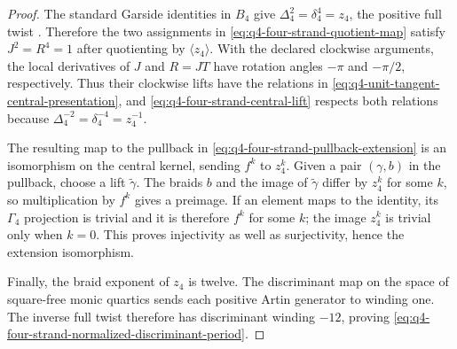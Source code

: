 \begin{proof}
The standard Garside identities in $B_4$ give
$\Delta_4^2=\delta_4^4=z_4$, the positive full twist
\cite[Chapter~1]{Birman1974Braids}.  Therefore the two assignments in
\eqref{eq:q4-four-strand-quotient-map} satisfy $J^2=R^4=1$ after quotienting by
$\langle z_4\rangle$.  With the declared clockwise arguments, the local
derivatives of $J$ and $R=JT$ have rotation angles $-\pi$ and $-\pi/2$,
respectively.  Thus their clockwise lifts have the
relations in \eqref{eq:q4-unit-tangent-central-presentation}, and
\eqref{eq:q4-four-strand-central-lift} respects both relations because
$\Delta_4^{-2}=\delta_4^{-4}=z_4^{-1}$.

The resulting map to the pullback in
\eqref{eq:q4-four-strand-pullback-extension} is an isomorphism on the central
kernel, sending $f^k$ to $z_4^k$.  Given a pair $(\gamma,b)$ in the pullback,
choose a lift $\widetilde\gamma$.  The braids $b$ and the image of
$\widetilde\gamma$ differ by $z_4^k$ for some $k$, so multiplication by $f^k$
gives a preimage.  If an element maps to the identity, its $\Gamma_4$ projection
is trivial and it is therefore $f^k$ for some $k$; the image $z_4^k$ is trivial
only when $k=0$.  This proves injectivity as well as surjectivity, hence the
extension isomorphism.

Finally, the braid exponent of $z_4$ is twelve.  The discriminant map on the
space of square-free monic quartics sends each positive Artin generator to
winding one.  The inverse full twist therefore has discriminant winding
$-12$, proving \eqref{eq:q4-four-strand-normalized-discriminant-period}.
\end{proof}

